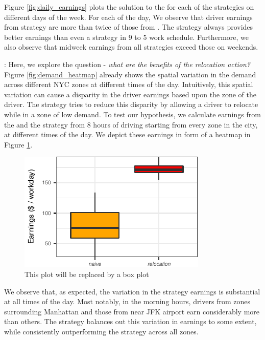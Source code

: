 Figure \ref{fig:daily_earnings} plots the solution to the {\originalproblem} for each of the strategies on different days of the week. For each of the day, We observe that driver earnings from {\relocationflexible} strategy are more than twice of those from {\naive}. The {\flexible} strategy always provides better earnings than even a {\relocation} strategy in 9 to 5 work schedule. Furthermore, we also observe that midweek earnings from all strategies exceed those on weekends.

: Here, we explore the question - \textit{what are the benefits of the relocation action?} Figure \ref{fig:demand_heatmap} already shows the spatial variation in the demand across different NYC zones at different times of the day. Intuitively, this spatial variation can cause a disparity in the driver earnings based upon the zone of the driver. The {\relocation} strategy tries to reduce this disparity by allowing a driver to relocate while in a zone of low demand. To test our hypothesis, we calculate earnings from the {\naive} and the {\relocation} strategy from 8 hours of driving starting from every zone in the city, at different times of the day. We depict these earnings in form of a heatmap in Figure \ref{fig:earnings_heatmap}.

\begin{figure}
	\includegraphics{figures/earnings_heatmap.pdf}
	\caption{This plot will be replaced by a box plot}
	\label{fig:earnings_heatmap}
\end{figure}

We observe that, as expected, the variation in the {\naive} strategy earnings is substantial at all times of the day. Most notably, in the morning hours, drivers from zones surrounding Manhattan and those from near JFK airport earn considerably more than others. The {\relocation} strategy balances out this variation in earnings to some extent, while consistently outperforming the {\naive} strategy across all zones.

